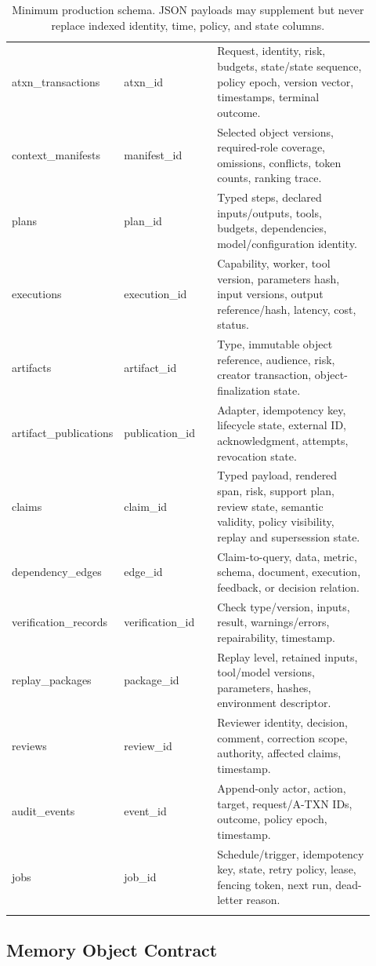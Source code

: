 \documentclass[10pt]{article}
\newcommand{\atxn}{\textsc{A-TXN}\xspace}
\begin{document}
\begin{longtable}{L{0.21\linewidth}L{0.26\linewidth}L{0.45\linewidth}}
atxn\_transactions & atxn\_id & Request, identity, risk, budgets, state/state sequence, policy epoch, version vector, timestamps, terminal outcome. \\
context\_manifests & manifest\_id & Selected object versions, required-role coverage, omissions, conflicts, token counts, ranking trace. \\
plans & plan\_id & Typed steps, declared inputs/outputs, tools, budgets, dependencies, model/configuration identity. \\
executions & execution\_id & Capability, worker, tool version, parameters hash, input versions, output reference/hash, latency, cost, status. \\
artifacts & artifact\_id & Type, immutable object reference, audience, risk, creator transaction, object-finalization state. \\
artifact\_publications & publication\_id & Adapter, idempotency key, lifecycle state, external ID, acknowledgment, attempts, revocation state. \\
claims & claim\_id & Typed payload, rendered span, risk, support plan, review state, semantic validity, policy visibility, replay and supersession state. \\
dependency\_edges & edge\_id & Claim-to-query, data, metric, schema, document, execution, feedback, or decision relation. \\
verification\_records & verification\_id & Check type/version, inputs, result, warnings/errors, repairability, timestamp. \\
replay\_packages & package\_id & Replay level, retained inputs, tool/model versions, parameters, hashes, environment descriptor. \\
reviews & review\_id & Reviewer identity, decision, comment, correction scope, authority, affected claims, timestamp. \\
audit\_events & event\_id & Append-only actor, action, target, request/\atxn IDs, outcome, policy epoch, timestamp. \\
jobs & job\_id & Schedule/trigger, idempotency key, state, retry policy, lease, fencing token, next run, dead-letter reason. \\
\bottomrule
\caption{Minimum production schema. JSON payloads may supplement but never replace indexed identity, time, policy, and state columns.}
\end{longtable}

\subsection{Memory Object Contract}
\end{document}
